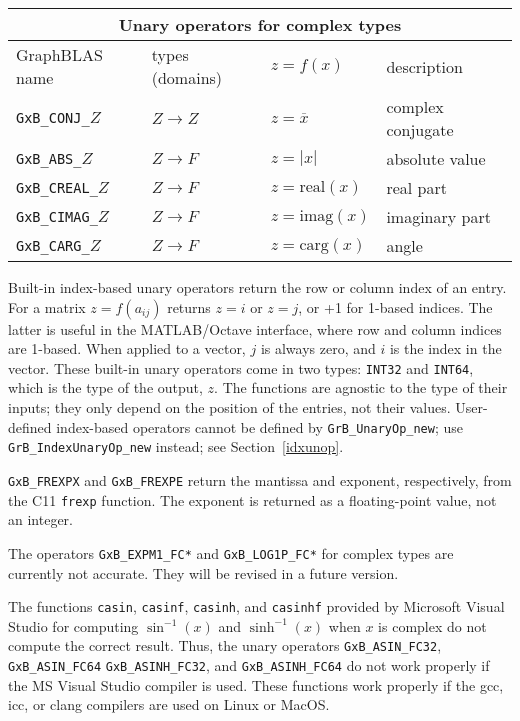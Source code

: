 \documentclass[12pt]{article}
\begin{document}
{\begin{tabular}{|llll|}
\hline
\multicolumn{4}{|c|}{Unary operators for complex types} \\
\hline
GraphBLAS name          & types (domains)   & $z=f(x)$      & description \\
\hline
\verb'GxB_CONJ_'$Z$    & $Z \rightarrow Z$ & $z = \overline{x}$     & complex conjugate \\
\verb'GxB_ABS_'$Z$     & $Z \rightarrow F$ & $z = |x|$              & absolute value \\
\verb'GxB_CREAL_'$Z$   & $Z \rightarrow F$ & $z = \mbox{real}(x)$   & real part \\
\verb'GxB_CIMAG_'$Z$   & $Z \rightarrow F$ & $z = \mbox{imag}(x)$   & imaginary part \\
\verb'GxB_CARG_'$Z$    & $Z \rightarrow F$ & $z = \mbox{carg}(x)$   & angle \\
\hline
\end{tabular}
}
\vspace{0.2in}

Built-in index-based unary operators return the row or column index of an entry.  For a
matrix $z=f(a_{ij})$ returns $z = i$ or $z = j$, or +1 for 1-based indices.
The latter is useful in the MATLAB/Octave interface, where row and column indices are
1-based.  When applied to a vector, $j$ is always zero, and $i$ is the index in
the vector.  These built-in unary operators come in two types: \verb'INT32' and
\verb'INT64', which is the type of the output, $z$.  The functions are agnostic
to the type of their inputs; they only depend on the position of the entries,
not their values.
User-defined index-based operators cannot be defined by \verb'GrB_UnaryOp_new';
use \verb'GrB_IndexUnaryOp_new' instead; see Section~\ref{idxunop}.

\verb'GxB_FREXPX' and \verb'GxB_FREXPE' return the mantissa and exponent,
respectively, from the C11 \verb'frexp' function.  The exponent is
returned as a floating-point value, not an integer.

The operators \verb'GxB_EXPM1_FC*' and \verb'GxB_LOG1P_FC*' for complex
types are currently not accurate.  They will be revised in a future version.

The functions \verb'casin', \verb'casinf', \verb'casinh', and \verb'casinhf'
provided by Microsoft Visual Studio for computing $\sin^{-1}(x)$ and
$\sinh^{-1}(x)$ when $x$ is complex do not compute the correct result.  Thus,
the unary operators \verb'GxB_ASIN_FC32', \verb'GxB_ASIN_FC64'
\verb'GxB_ASINH_FC32', and \verb'GxB_ASINH_FC64' do not work properly if the MS
Visual Studio compiler is used.  These functions work properly if the gcc, icc,
or clang compilers are used on Linux or MacOS.
\end{document}
